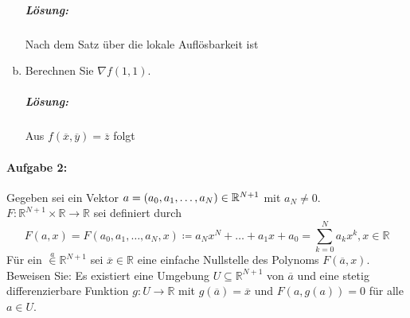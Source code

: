 \documentclass{scrreprt}
\begin{document}
\begin{enumerate}[a)]
  \subparagraph{Lösung:} Nach dem Satz über die lokale Auflösbarkeit ist

\newpage
\item Berechnen Sie $\nabla f(1, 1)$.

  \subparagraph{Lösung:} Aus $f(\overline{x}, \overline{y}) = \overline{z}$ folgt
\end{enumerate}

\paragraph{Aufgabe 2:} Gegeben sei ein Vektor
$a = \qty(a_0, a_1, \ldots, a_N) \in \mathbb{R}^{N + 1}$ mit $a_N \ne 0$.
$F \colon \mathbb{R}^{N + 1} \times \mathbb{R} \to \mathbb{R}$ sei definiert durch
\[
  F(a, x) = F(a_0, a_1, \ldots, a_N, x) \coloneqq
  a_Nx^N + \ldots + a_1x + a_0 = \sum_{k = 0}^N a_kx^k, x \in \mathbb{R}
\]
Für ein $\overset{a} \in \mathbb{R}^{N + 1}$ sei $\overline{x} \in \mathbb{R}$
eine einfache Nullstelle des Polynoms $F(\overline{a}, x)$.
Beweisen Sie: Es existiert eine Umgebung $U \subseteq \mathbb{R}^{N + 1}$ von
$\overline{a}$ und eine stetig differenzierbare Funktion
$g \colon U \to \mathbb{R}$ mit $g(\overline{a}) = \overline{x}$ und
$F(a, g(a)) = 0$ für alle $a \in U$.
\end{document}
